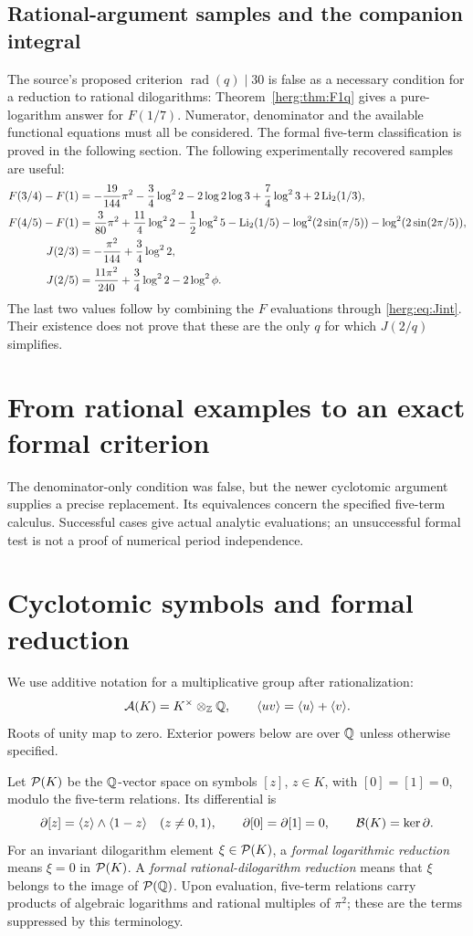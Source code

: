 \subsection{Rational-argument samples and the companion integral}
The source's proposed criterion $\operatorname{rad}(q)\mid30$ is false
as a necessary condition for a reduction to rational dilogarithms:
Theorem~\ref{herg:thm:F1q} gives a pure-logarithm answer for $F(1/7)$.
Numerator, denominator and the available functional equations must all be
considered. The formal five-term classification is proved in the following section.
The following experimentally recovered samples are useful:
\begin{align*}
F(3/4)-F(1)&=-\frac{19}{144}\pi^2-\frac34\log^22
-2\log2\log3+\frac74\log^23+2\operatorname{Li}_2(1/3),\\
F(4/5)-F(1)&=\frac3{80}\pi^2+\frac{11}4\log^22-\frac12\log^25
-\operatorname{Li}_2(1/5)-\log^2(2\sin(\pi/5))-\log^2(2\sin(2\pi/5)),\\
J(2/3)&=-\frac{\pi^2}{144}+\frac34\log^22,\\
J(2/5)&=\frac{11\pi^2}{240}+\frac34\log^22-2\log^2\phi.
\end{align*}
The last two values follow by combining the $F$ evaluations through
\eqref{herg:eq:Jint}. Their existence does not prove that these are the
only $q$ for which $J(2/q)$ simplifies.

\section{From rational examples to an exact formal criterion}
The denominator-only condition was false, but the newer cyclotomic
argument supplies a precise replacement. Its equivalences concern the
specified five-term calculus. Successful cases give actual analytic
evaluations; an unsuccessful formal test is not a proof of numerical
period independence.

\section{Cyclotomic symbols and formal reduction}
\label{hstruct:sec:formal}
We use additive notation for a multiplicative group after rationalization:
\[
 \mathcal A(K)=K^\times\otimes_{\mathbb{Z}}\mathbb{Q},
 \qquad \langle uv\rangle=\langle u\rangle+\langle v\rangle.
\]
Roots of unity map to zero. Exterior powers below are over $\mathbb{Q}$ unless
otherwise specified.

\begin{definition}\label{hstruct:def:formal}
Let $\mathcal P(K)$ be the $\mathbb{Q}$-vector space on symbols $[z]$, $z\in K$, with
$[0]=[1]=0$, modulo the five-term relations. Its differential is
\[
 \partial[z]=\langle z\rangle\wedge\langle 1-z\rangle\quad(z\ne0,1),
 \qquad \partial[0]=\partial[1]=0,
 \qquad \mathcal B(K)=\ker\partial.
\]
For an invariant dilogarithm element $\xi\in\mathcal P(K)$, a
\emph{formal logarithmic reduction} means $\xi=0$ in $\mathcal P(K)$.
A \emph{formal rational-dilogarithm reduction} means that $\xi$ belongs
to the image of $\mathcal P(\mathbb{Q})$. Upon evaluation, five-term relations carry
products of algebraic logarithms and rational multiples of $\pi^2$;
these are the terms suppressed by this terminology.
\end{definition}


